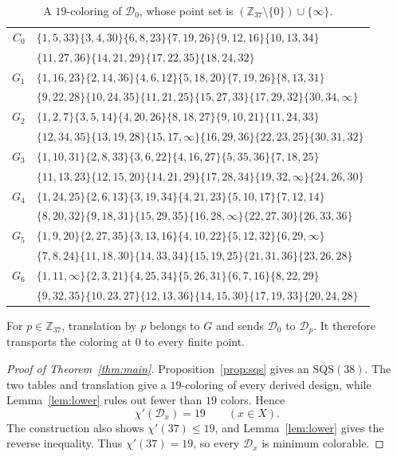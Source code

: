 \documentclass[11pt]{amsart}
\newcommand{\Z}{\mathbb Z}
\newcommand{\SQS}{\mathrm{SQS}}
\begin{document}
\begin{table}[htb]
\caption{A $19$-coloring of $\mathcal D_{0}$, whose point set is $(\Z_{37}\setminus\{0\})\cup\{\infty\}$.}\label{tab:zero}
\footnotesize
\begin{tabular}{@{}r@{\;\;}l@{}}
$C_0$ & $\{1,5,33\}$\;$\{3,4,30\}$\;$\{6,8,23\}$\;$\{7,19,26\}$\;$\{9,12,16\}$\;$\{10,13,34\}$ \\
 & $\{11,27,36\}$\;$\{14,21,29\}$\;$\{17,22,35\}$\;$\{18,24,32\}$ \\
$G_1$ & $\{1,16,23\}$\;$\{2,14,36\}$\;$\{4,6,12\}$\;$\{5,18,20\}$\;$\{7,19,26\}$\;$\{8,13,31\}$ \\
 & $\{9,22,28\}$\;$\{10,24,35\}$\;$\{11,21,25\}$\;$\{15,27,33\}$\;$\{17,29,32\}$\;$\{30,34,\infty\}$ \\
$G_2$ & $\{1,2,7\}$\;$\{3,5,14\}$\;$\{4,20,26\}$\;$\{8,18,27\}$\;$\{9,10,21\}$\;$\{11,24,33\}$ \\
 & $\{12,34,35\}$\;$\{13,19,28\}$\;$\{15,17,\infty\}$\;$\{16,29,36\}$\;$\{22,23,25\}$\;$\{30,31,32\}$ \\
$G_3$ & $\{1,10,31\}$\;$\{2,8,33\}$\;$\{3,6,22\}$\;$\{4,16,27\}$\;$\{5,35,36\}$\;$\{7,18,25\}$ \\
 & $\{11,13,23\}$\;$\{12,15,20\}$\;$\{14,21,29\}$\;$\{17,28,34\}$\;$\{19,32,\infty\}$\;$\{24,26,30\}$ \\
$G_4$ & $\{1,24,25\}$\;$\{2,6,13\}$\;$\{3,19,34\}$\;$\{4,21,23\}$\;$\{5,10,17\}$\;$\{7,12,14\}$ \\
 & $\{8,20,32\}$\;$\{9,18,31\}$\;$\{15,29,35\}$\;$\{16,28,\infty\}$\;$\{22,27,30\}$\;$\{26,33,36\}$ \\
$G_5$ & $\{1,9,20\}$\;$\{2,27,35\}$\;$\{3,13,16\}$\;$\{4,10,22\}$\;$\{5,12,32\}$\;$\{6,29,\infty\}$ \\
 & $\{7,8,24\}$\;$\{11,18,30\}$\;$\{14,33,34\}$\;$\{15,19,25\}$\;$\{21,31,36\}$\;$\{23,26,28\}$ \\
$G_6$ & $\{1,11,\infty\}$\;$\{2,3,21\}$\;$\{4,25,34\}$\;$\{5,26,31\}$\;$\{6,7,16\}$\;$\{8,22,29\}$ \\
 & $\{9,32,35\}$\;$\{10,23,27\}$\;$\{12,13,36\}$\;$\{14,15,30\}$\;$\{17,19,33\}$\;$\{20,24,28\}$ \\
\end{tabular}
\end{table}

For $p\in\Z_{37}$, translation by $p$ belongs to $G$ and sends
$\mathcal D_0$ to $\mathcal D_p$. It therefore transports the coloring
at $0$ to every finite point.

\begin{proof}[Proof of Theorem~\ref{thm:main}]
Proposition~\ref{prop:sqs} gives an $\SQS(38)$. The two tables and
translation give a $19$-coloring of every derived design, while
Lemma~\ref{lem:lower} rules out fewer than $19$ colors. Hence
\[
\chi'(\mathcal D_x)=19\qquad(x\in X).
\]
The construction also shows $\chi'(37)\leq19$, and
Lemma~\ref{lem:lower} gives the reverse inequality. Thus
$\chi'(37)=19$, so every $\mathcal D_x$ is minimum colorable.
\end{proof}
\end{document}
